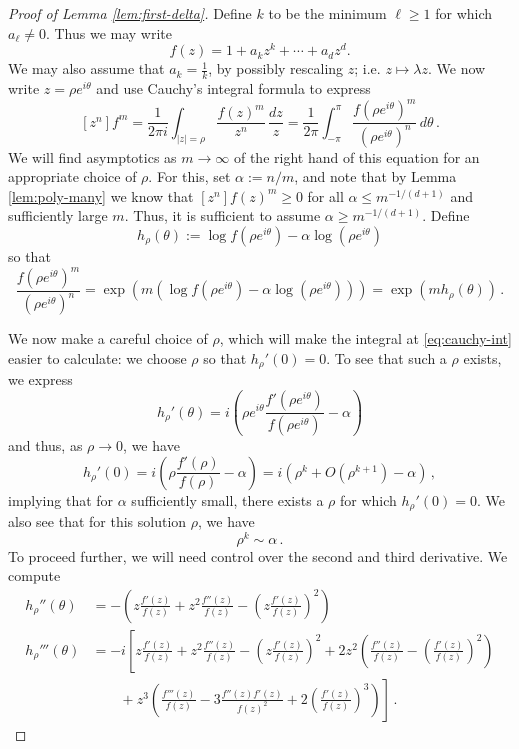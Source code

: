 \documentclass{daj}
\def\eit{e^{i\theta}}
\theoremstyle{definition}
\theoremstyle{remark}
\begin{document}
\begin{proof}[Proof of Lemma \ref{lem:first-delta}]
	Define $k$ to be the minimum $\ell \geq 1$ for which $a_{\ell} \not= 0 $.  Thus we may write 
	\[f(z) = 1 + a_k z^k + \cdots + a_d z^d.\] We may also assume that $a_k = \frac{1}{k}$, by possibly rescaling $z$; i.e. $z \mapsto \lambda z$.
	We now write $z = \rho e^{i\theta}$ and use Cauchy's integral formula to express  \begin{equation} \label{eq:cauchy-int}
	[z^n]f^m = \frac{1}{2\pi i} \int_{|z|= \rho} \frac{f(z)^m}{z^n} \, \frac{dz}{z} =  \frac{1}{2\pi}\int_{-\pi}^\pi \frac{f(\rho e^{i\theta})^m}{(\rho e^{i\theta})^n } \, d\theta\,.
	\end{equation}	
	We will find asymptotics as $m \to \infty$ of the right hand of this equation for an appropriate choice of $\rho$. For this, set $\alpha := n/m$, and note that by Lemma \ref{lem:poly-many} we know that $[z^n]f(z)^{m} \geq 0$ for all $\alpha \leq  m^{-1/(d+1)}$ and sufficiently large $m$.  Thus, it is sufficient to assume $\alpha \geq  m^{-{1}/({d+1})}$.  
	Define \[h_\rho(\theta) := \log f(\rho \eit) - \alpha \log(\rho \eit) \] 
	so that 
	$$ \frac{f(\rho \eit)^m}{(\rho \eit)^n} = \exp\left(m \left(\log f(\rho \eit) - \alpha \log (\rho \eit) \right) \right) = \exp\left( m h_\rho(\theta) \right)\,.$$
	
	We now make a careful choice of $\rho$, which will make the integral at \eqref{eq:cauchy-int} easier to calculate: we choose $\rho$ so that $h_\rho'(0) = 0$.  
	To see that such a $\rho$ exists, we express
	$$h_\rho'(\theta) = i\left( \rho \eit \frac{f'(\rho \eit)}{f(\rho \eit)} - \alpha \right)$$ 
	and thus, as $\rho \to 0$, we have 
	$$h_\rho'(0) = i\left(\rho \frac{f'(\rho)}{f(\rho)} - \alpha \right) = i\left(\rho^k + O(\rho^{k+1}) - \alpha \right)\, ,$$ implying that for $\alpha$ sufficiently small, there exists a $\rho$ for which $h_\rho'(0) = 0$.  We also see that for this solution $\rho$, we have\begin{equation}\label{eq:rho-alpha} 
	\rho^k \sim \alpha\,.
	\end{equation}
	To proceed further, we will need control over the second and third derivative. We compute 
	\begin{align*}
	h_\rho''(\theta) &= - \left( z\frac{f'(z)}{f(z)} + z^2 \frac{f''(z)}{f(z)} -  \left(z \frac{f'(z)}{f(z)}\right)^2 \right) \\
	h_\rho'''(\theta) &= -i \left[ z\frac{f'(z)}{f(z)} + z^2 \frac{f''(z)}{f(z)} -  \left(z \frac{f'(z)}{f(z)}\right)^2+ 2 z^2\left(\frac{f''(z)}{f(z)} - \left(\frac{f'(z)}{f(z)} \right)^2  \right) \right. \\
	& \left. \qquad+ z^3 \left(\frac{f'''(z)}{f(z)} - 3\frac{f''(z)f'(z)}{f(z)^2}  + 2 \left(\frac{f'(z)}{f(z)} \right)^3 \right)   \right] \,.
	\end{align*}
	

\end{proof}
\end{document}
